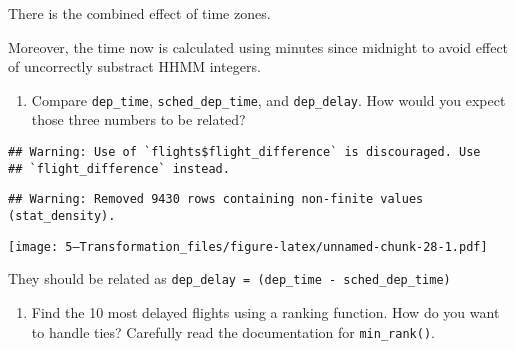 \documentclass[
]{article}
\newenvironment{Shaded}{\begin{snugshade}}{\end{snugshade}}
\newcommand{\AttributeTok}[1]{\textcolor[rgb]{0.77,0.63,0.00}{#1}}
\newcommand{\ConstantTok}[1]{\textcolor[rgb]{0.00,0.00,0.00}{#1}}
\newcommand{\FunctionTok}[1]{\textcolor[rgb]{0.00,0.00,0.00}{#1}}
\newcommand{\NormalTok}[1]{#1}
\newcommand{\OtherTok}[1]{\textcolor[rgb]{0.56,0.35,0.01}{#1}}
\newcommand{\SpecialCharTok}[1]{\textcolor[rgb]{0.00,0.00,0.00}{#1}}
\newcommand{\StringTok}[1]{\textcolor[rgb]{0.31,0.60,0.02}{#1}}
\providecommand{\tightlist}{%
  \setlength{\itemsep}{0pt}\setlength{\parskip}{0pt}}
\begin{document}
There is the combined effect of time zones.

Moreover, the time now is calculated using minutes since midnight to
avoid effect of uncorrectly substract HHMM integers.

\begin{enumerate}
\def\labelenumi{\arabic{enumi}.}
\tightlist
\item
  Compare \texttt{dep\_time}, \texttt{sched\_dep\_time}, and
  \texttt{dep\_delay}. How would you expect those three numbers to be
  related?
\end{enumerate}

\begin{Shaded}
\end{Shaded}

\begin{verbatim}
## Warning: Use of `flights$flight_difference` is discouraged. Use
## `flight_difference` instead.
\end{verbatim}

\begin{verbatim}
## Warning: Removed 9430 rows containing non-finite values (stat_density).
\end{verbatim}

\texttt{[image: 5---Transformation\_files/figure-latex/unnamed-chunk-28-1.pdf]}

They should be related as
\texttt{dep\_delay\ =\ (dep\_time\ -\ sched\_dep\_time)}

\begin{enumerate}
\def\labelenumi{\arabic{enumi}.}
\tightlist
\item
  Find the 10 most delayed flights using a ranking function. How do you
  want to handle ties? Carefully read the documentation for
  \texttt{min\_rank()}.
\end{enumerate}
\end{document}
